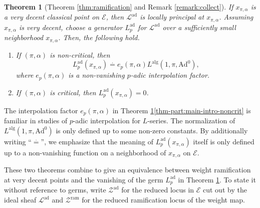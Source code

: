 \documentclass[10pt, twoside]{amsart}
\theoremstyle{plain}
\newtheorem{theorem}{Theorem}
\theoremstyle{definition}
\theoremstyle{remark}
\numberwithin{equation}{subsection}
\def\Ad{\mathrm{Ad}}
\def\alg{\mathrm{alg}}
\def\ad{\operatorname{ad}}
\def\scre{\mathscr E}
\def\scrl{\mathscr L}
\def\scrz{\mathscr{Z}}
\begin{document}
\begin{theorem}[Theorem \ref{thm:ramification}  and Remark \ref{remark:collect}]\label{thm:main-intro}
If $x_{\pi,\alpha}$ is a very decent classical point on $\scre$, then $\scrl^{\ad}$ is locally principal at $x_{\pi,\alpha}$. Assuming $x_{\pi,\alpha}$ is very decent, choose a generator $L_p^{\ad}$ for $\scrl^{\ad}$ over a sufficiently small neighborhood $x_{\pi,\alpha}$. Then, the following hold.
\begin{enumerate}[label=(\roman*)]
\item If $(\pi,\alpha)$ is non-critical, then 
\begin{equation*}
L_p^{\ad}(x_{\pi,\alpha}) \overset{\cdot}{=} e_p(\pi,\alpha)L^{\alg}(1,\pi,\Ad^0),
\end{equation*}
where $e_p(\pi,\alpha)$ is a non-vanishing $p$-adic interpolation factor.\label{thm-part:main-intro-noncrit}
\item If $(\pi,\alpha)$ is critical, then $L_p^{\ad}(x_{\pi,\alpha}) = 0$.
\end{enumerate}
\end{theorem}
The interpolation factor $e_p(\pi,\alpha)$ in Theorem \ref{thm:main-intro}\ref{thm-part:main-intro-noncrit} is familiar in studies of $p$-adic interpolation for $L$-series. The normalization of $L^{\alg}(1,\pi,\Ad^0)$ is only defined up to some non-zero constants. By additionally writing ``$\overset{\cdot}{=}$'', we emphasize that the meaning of $L_p^{\ad}(x_{\pi,\alpha})$ itself is only defined up to a non-vanishing function on a neighborhood of $x_{\pi,\alpha}$ on $\scre$. 

These two theorems combine to give an equivalence between weight ramification at very decent points and the vanishing of the germ $L_p^{\ad}$ in Theorem \ref{thm:main-intro}. To state it without reference to germs, write $\scrz^{\ad}$ for the reduced locus in $\scre$ cut out by the ideal sheaf $\scrl^{\ad}$ and $\scrz^{\mathrm{ram}}$ for the reduced ramification locus of the weight map.
\end{document}
